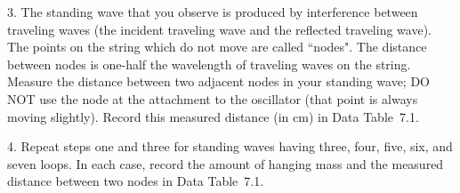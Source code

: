 \item{3.} The standing wave that you observe is produced
by interference between traveling waves (the incident 
traveling wave and the reflected traveling wave).  The 
points on the string which do not move are called 
``nodes".  The distance between nodes is one-half the 
wavelength of traveling waves on the string.  Measure 
the distance between two adjacent nodes in your standing 
wave; DO NOT use the node at the attachment to the 
oscillator (that point is always moving slightly).  
Record this measured distance (in cm) in 
Data Table~7.1.

\item{4.} Repeat steps one and three for standing
waves having three, four, five, six, and seven loops.
In each case, record the amount of hanging mass and
the measured distance between two nodes in 
Data Table~7.1.

